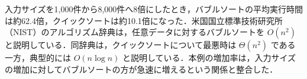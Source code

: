 入力サイズを1,000件から8,000件へ8倍にしたとき，バブルソートの平均実行時間は約62.4倍，クイックソートは約10.1倍になった．米国国立標準技術研究所（NIST）のアルゴリズム辞典は，任意データに対するバブルソートを $O(n^2)$ と説明している．同辞典は，クイックソートについて最悪時は $\Theta(n^2)$ である一方，典型的には $O(n\log n)$ と説明している．本例の増加率は，入力サイズの増加に対してバブルソートの方が急速に増えるという関係と整合した．
